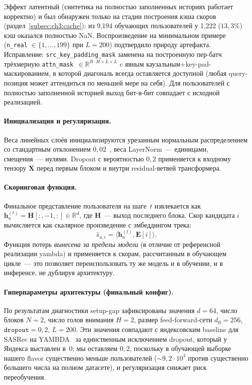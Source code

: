 Эффект латентный (синтетика на полностью заполненных историях работает корректно) и был обнаружен только на стадии построения кэша скоров (раздел~\ref{subsec:ch3:cache}): из 9{,}194 обучающих пользователей у 1{,}222 ($13{,}3\%$) кэш оказался полностью NaN. Воспроизведение на минимальном примере (\texttt{n\_real} $\in \{1, \ldots, 199\}$ при $L = 200$) подтвердило природу артефакта. Исправление: \texttt{src\_key\_padding\_mask} заменена на построенную пер-батч трёхмерную \texttt{attn\_mask $\in \mathbb{R}^{B \cdot H \times L \times L}$} c явным каузальным+key-pad-маскированием, в которой диагональ всегда оставляется доступной (любая query-позиция может аттендиться по меньшей мере на себя). Для пользователей с полностью заполненной историей выход бит-в-бит совпадает с исходной реализацией.

\paragraph{Инициализация и регуляризация.} Веса линейных слоёв инициализируются урезанным нормальным распределением со стандартным отклонением $0{,}02$~\cite{sasrec2018}, веса LayerNorm~--- единицами, смещения~--- нулями. Dropout с вероятностью $0{,}2$ применяется к входному тензору $\mathbf{X}$ перед первым блоком и внутри residual-ветвей трансформера.

\paragraph{Скоринговая функция.} Финальное представление пользователя на шаге~$t$ извлекается как $\mathbf{h}_u^{(t)} = \mathbf{H}[:, -1, :] \in \mathbb{R}^d$, где $\mathbf{H}$~--- выход последнего блока. Скор кандидата $i$ вычисляется как скалярное произведение с эмбеддингом трека:
\begin{equation*}
    \hat{s}_{u, i} = \langle \mathbf{h}_u^{(t)}, \mathbf{E}[i] \rangle.
\end{equation*}
Функция потерь \emph{вынесена за пределы модели} (в отличие от референсной реализации yambda) и применяется к скорам, рассчитанным в обучающем цикле~--- это позволяет переиспользовать ту же модель и в обучении, и в инференсе, не дублируя архитектуру.

\paragraph{Гиперпараметры архитектуры (финальный конфиг).} По результатам диагностики setup-gap зафиксированы значения $d = 64$, число блоков $N = 2$, число голов внимания $H = 2$, размер feed-forward-сети $d_{\mathrm{ff}} = 256$, $\mathtt{dropout} = 0{,}2$, $L = 200$. Эти значения совпадают с яндексовским baseline для SASRec на YAMBDA~\cite{yambda2025} за единственным исключением dropout, который у Яндекса выставлен в~0; мы оставляем $0{,}2$, поскольку в обучающей выборке нашего flavor существенно меньше пользователей ($\sim\!9{,}2 \cdot 10^3$ против существенно большего числа на полном датасете), и регуляризация снижает риск переобучения.

